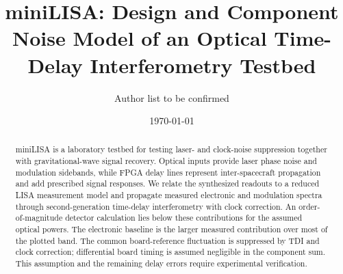 \documentclass[aps,twocolumn,10pt,nofootinbib,floatfix]{revtex4-2}
\begin{document}

\title{miniLISA: Design and Component Noise Model of an Optical Time-Delay Interferometry Testbed}%

\author{Author list to be confirmed}
%
\date{\today}%

\begin{abstract}
miniLISA is a laboratory testbed for testing laser- and clock-noise suppression together with gravitational-wave signal recovery. Optical inputs provide laser phase noise and modulation sidebands, while FPGA delay lines represent inter-spacecraft propagation and add prescribed signal responses. We relate the synthesized readouts to a reduced LISA measurement model and propagate measured electronic and modulation spectra through second-generation time-delay interferometry with clock correction. An order-of-magnitude detector calculation lies below these contributions for the assumed optical powers. The electronic baseline is the larger measured contribution over most of the plotted band. The common board-reference fluctuation is suppressed by TDI and clock correction; differential board timing is assumed negligible in the component sum. This assumption and the remaining delay errors require experimental verification.

\end{abstract}

\maketitle






%
\end{document}

